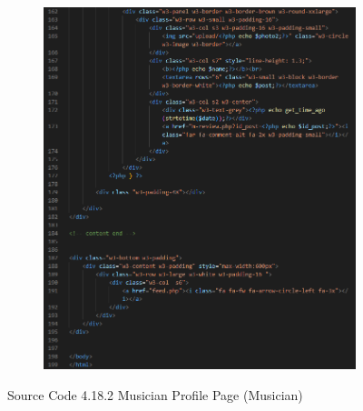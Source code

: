 \begin{enumerate}[1.]
\begin{figure}[h]
\begin{subfigure}[b]{0.8\textwidth}
            \includegraphics[width=\textwidth]{mainmatter/images/frontend/code/mprofile3.png}
            \label{fig:sub3}
        \end{subfigure}
        \caption*{Source Code 4.18.2 Musician Profile Page (Musician)}
        \label{fig:myfig57b}
    \end{figure}
    \clearpage


\end{enumerate}
